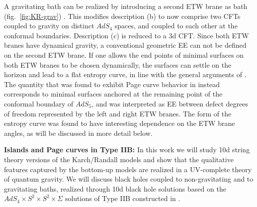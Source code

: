 \documentclass[aps,prd,11pt,notitlepage,longbibliography,nofootinbib,tightenlines,preprintnumbers]{revtex4-1}
\begin{document}
A gravitating bath can be realized by introducing a second ETW brane as bath (fig.~\ref{fig:KR-grav}) \cite{Geng:2020fxl}.
This modifies description (b) to now comprise two CFTs coupled to gravity on distinct $AdS_4$ spaces, and coupled to each other at the conformal boundaries.
Description (c) is reduced to a 3d CFT.
Since both ETW branes have dynamical gravity, a conventional geometric EE can not be defined on the second ETW brane.
If one allows the end points of minimal surfaces on both ETW branes to be chosen dynamically, the surfaces can settle on the horizon and lead to a flat entropy curve, in line with the general arguments of \cite{Laddha:2020kvp}.
The quantity that was found to exhibit Page curve behavior in \cite{Geng:2020fxl} instead corresponds to minimal surfaces anchored at the remaining point of the conformal boundary of $AdS_5$, and was interpreted as EE between defect degrees of freedom represented by the left and right ETW branes.
The form of the entropy curve was found to have interesting dependence on the ETW brane angles, as will be discussed in more detail below.


\medskip
\textbf{Islands and Page curves in Type IIB:}
In this work we will study 10d  string theory versions of the Karch/Randall models
and show that the qualitative features captured by the bottom-up models are realized in a  UV-complete theory of quantum gravity.
We will discuss black holes coupled to non-gravitating and to gravitating baths, realized through 10d black hole solutions based on the $AdS_4\times S^2\times S^2\times\Sigma$ solutions of Type IIB constructed in \cite{DHoker:2007zhm,DHoker:2007hhe,Aharony:2011yc,Assel:2011xz}.
\end{document}
